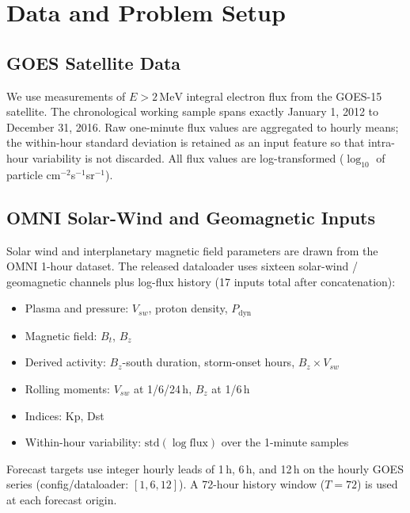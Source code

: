 \documentclass{ieeeaccess}
\begin{document}
\section{Data and Problem Setup}
\label{sec:data}

\subsection{GOES Satellite Data}
We use measurements of \(E>2\,\mathrm{MeV}\) integral electron flux from the
GOES-15 satellite. The chronological working sample spans exactly January 1, 2012
to December 31, 2016. Raw one-minute flux values are aggregated to hourly means;
the within-hour standard deviation is retained as an input feature so that
intra-hour variability is not discarded. All flux values are log-transformed
(\(\log_{10}\) of particle cm\(^{-2}\)s\(^{-1}\)sr\(^{-1}\)).

\subsection{OMNI Solar-Wind and Geomagnetic Inputs}
Solar wind and interplanetary magnetic field parameters are drawn from the OMNI
1-hour dataset. The released dataloader uses sixteen solar-wind / geomagnetic channels plus log-flux history (17 inputs total after concatenation):
\begin{itemize}
\item Plasma and pressure: \(V_{sw}\), proton density, \(P_{\mathrm{dyn}}\)
\item Magnetic field: \(B_t\), \(B_z\)
\item Derived activity: \(B_z\)-south duration, storm-onset hours, \(B_z\times V_{sw}\)
\item Rolling moments: \(V_{sw}\) at 1/6/24\,h, \(B_z\) at 1/6\,h
\item Indices: Kp, Dst
\item Within-hour variability: \(\mathrm{std}(\log\mathrm{flux})\) over the 1-minute samples
\end{itemize}
Forecast targets use integer hourly leads of 1\,h, 6\,h, and 12\,h on the hourly GOES series (config/dataloader: $[1,6,12]$). A 72-hour history window (\(T=72\)) is used at each forecast origin.
\end{document}
